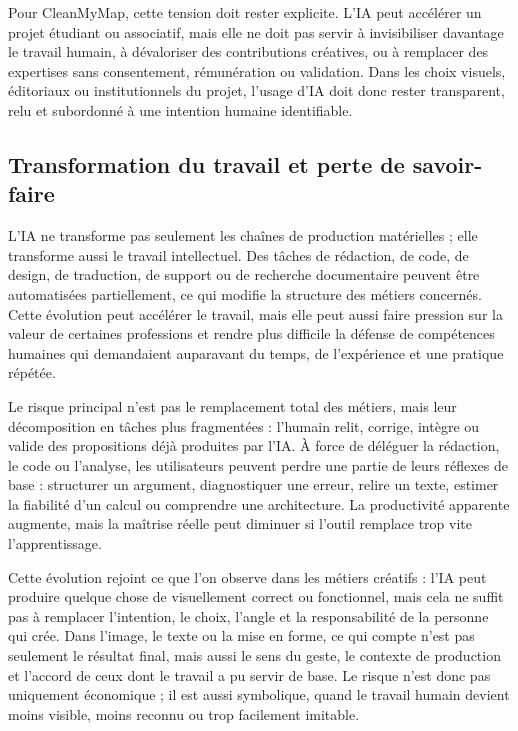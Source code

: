 \documentclass[
  10pt,
  a4paper,
  DIV=11,
  numbers=noendperiod,
  oneside]{scrreprt}
\begin{document}
Pour CleanMyMap, cette tension doit rester explicite. L'IA peut
accélérer un projet étudiant ou associatif, mais elle ne doit pas servir
à invisibiliser davantage le travail humain, à dévaloriser des
contributions créatives, ou à remplacer des expertises sans
consentement, rémunération ou validation. Dans les choix visuels,
éditoriaux ou institutionnels du projet, l'usage d'IA doit donc rester
transparent, relu et subordonné à une intention humaine identifiable.

\subsection{Transformation du travail et perte de
savoir-faire}\label{transformation-du-travail-et-perte-de-savoir-faire}

L'IA ne transforme pas seulement les chaînes de production matérielles ;
elle transforme aussi le travail intellectuel. Des tâches de rédaction,
de code, de design, de traduction, de support ou de recherche
documentaire peuvent être automatisées partiellement, ce qui modifie la
structure des métiers concernés. Cette évolution peut accélérer le
travail, mais elle peut aussi faire pression sur la valeur de certaines
professions et rendre plus difficile la défense de compétences humaines
qui demandaient auparavant du temps, de l'expérience et une pratique
répétée.

Le risque principal n'est pas le remplacement total des métiers, mais
leur décomposition en tâches plus fragmentées : l'humain relit, corrige,
intègre ou valide des propositions déjà produites par l'IA. À force de
déléguer la rédaction, le code ou l'analyse, les utilisateurs peuvent
perdre une partie de leurs réflexes de base : structurer un argument,
diagnostiquer une erreur, relire un texte, estimer la fiabilité d'un
calcul ou comprendre une architecture. La productivité apparente
augmente, mais la maîtrise réelle peut diminuer si l'outil remplace trop
vite l'apprentissage.

Cette évolution rejoint ce que l'on observe dans les métiers créatifs :
l'IA peut produire quelque chose de visuellement correct ou fonctionnel,
mais cela ne suffit pas à remplacer l'intention, le choix, l'angle et la
responsabilité de la personne qui crée. Dans l'image, le texte ou la
mise en forme, ce qui compte n'est pas seulement le résultat final, mais
aussi le sens du geste, le contexte de production et l'accord de ceux
dont le travail a pu servir de base. Le risque n'est donc pas uniquement
économique ; il est aussi symbolique, quand le travail humain devient
moins visible, moins reconnu ou trop facilement imitable.
\end{document}

